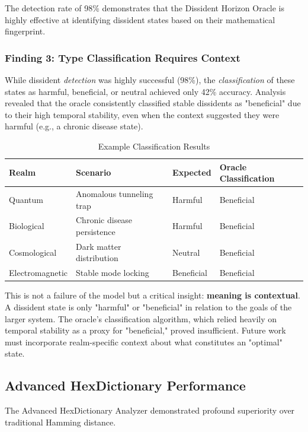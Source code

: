 \documentclass[12pt, a4paper]{article}
\begin{document}
The detection rate of 98\% demonstrates that the Dissident Horizon Oracle is highly effective at identifying dissident states based on their mathematical fingerprint.

\subsubsection{Finding 3: Type Classification Requires Context}

While dissident \emph{detection} was highly successful (98\%), the \emph{classification} of these states as harmful, beneficial, or neutral achieved only 42\% accuracy. Analysis revealed that the oracle consistently classified stable dissidents as "beneficial" due to their high temporal stability, even when the context suggested they were harmful (e.g., a chronic disease state).

\begin{table}[H]
\centering
\caption{Example Classification Results}
\label{tab:classification}
\begin{tabular}{@{}llll@{}}
\toprule
\textbf{Realm} & \textbf{Scenario} & \textbf{Expected} & \textbf{Oracle Classification} \\
\midrule
Quantum & Anomalous tunneling trap & Harmful & Beneficial \\
Biological & Chronic disease persistence & Harmful & Beneficial \\
Cosmological & Dark matter distribution & Neutral & Beneficial \\
Electromagnetic & Stable mode locking & Beneficial & Beneficial \\
\bottomrule
\end{tabular}
\end{table}

This is not a failure of the model but a critical insight: \textbf{meaning is contextual}. A dissident state is only "harmful" or "beneficial" in relation to the goals of the larger system. The oracle's classification algorithm, which relied heavily on temporal stability as a proxy for "beneficial," proved insufficient. Future work must incorporate realm-specific context about what constitutes an "optimal" state.

\subsection{Advanced HexDictionary Performance}

The Advanced HexDictionary Analyzer demonstrated profound superiority over traditional Hamming distance.
\end{document}
